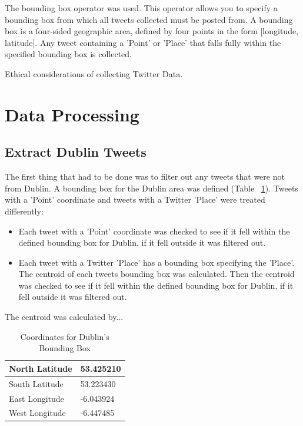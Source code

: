 The bounding box operator was used. This operator allows you to specify a bounding box from which all tweets collected must be posted from. A bounding box is a four-sided geographic area, defined by four points in the form [longitude, latitude]. Any tweet containing a 'Point' or 'Place' that falls fully within the specified bounding box is collected. 

Ethical considerations of collecting Twitter Data.

\section{Data Processing}

\subsection*{Extract Dublin Tweets}

The first thing that had to be done was to filter out any tweets that were not from Dublin. A bounding box for the Dublin area was defined (Table ~\ref{tab:dublinbb}). Tweets with a 'Point' coordinate and tweets with a Twitter 'Place' were treated differently:
\begin{itemize}
    \item Each tweet with a 'Point' coordinate was checked to see if it fell within the defined bounding box for Dublin, if it fell outside it was filtered out.
    \item Each tweet with a Twitter 'Place' has a bounding box specifying the 'Place'. The centroid of each tweets bounding box was calculated. Then the centroid was checked to see if it fell within the defined bounding box for Dublin, if it fell outside it was filtered out.
\end{itemize}

The centroid was calculated by...

\begin{table}[h!]
\caption{Coordinates for Dublin's Bounding Box}
\label{tab:dublinbb}
\begin{tabular}{|l|l|}
\hline
North Latitude  & 53.425210 \\ \hline
South Latitude  & 53.223430 \\ \hline
East Longitude & -6.043924 \\ \hline
West Longitude & -6.447485 \\ \hline
\end{tabular}
\end{table}

